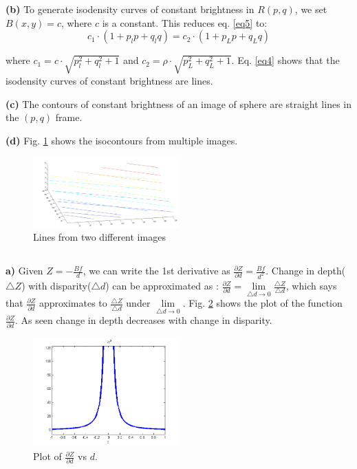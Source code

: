 \documentclass[11pt]{article}
\begin{document}
\textbf{(b)} To generate isodensity curves of constant brightness in $R(p,q)$, we set $B(x,y) = c$, where $c$ is a constant. This reduces eq. \ref{eq5} to:
\vspace{-10pt}
\begin{equation}
 c_1 \cdot (1+p_l p + q_lq) = c_2 \cdot (1+p_L p + q_L q) 
 \label{eq6}
\end{equation}

where $c_1 = c \cdot \sqrt{p_l^2 + q_l^2 + 1}$ and $c_2 = \rho \cdot \sqrt{p_L^2 + q_L^2 + 1}$. Eq. \ref{eq4} shows that the isodensity curves of constant brightness are lines. 

\textbf{(c)} The contours of constant brightness of an image of sphere are straight lines in the $(p,q)$ frame.

\textbf{(d)} Fig. \ref{fig4} shows the isocontours from multiple images. 

\begin{figure}[!hbt]
\centering
\includegraphics[width=0.5\textwidth]{q2d.png}
\caption{Lines from two different images}
\label{fig4}
\end{figure}
\vspace{-10pt}
\subsection{} 
\textbf{a)} Given $Z = -\frac{Bf}{d}$, we can write the 1st derivative as $\frac{\partial Z}{\partial d} = \frac{Bf}{d^2}$. Change in depth($\triangle Z$) with disparity($\triangle d$) can be approximated as : $\frac{\partial Z}{\partial d} = \lim\limits_{\triangle d \rightarrow 0}\frac{\triangle Z}{\triangle d} $, which says that  $\frac{\partial Z}{\partial d}$ approximates to $\frac{\triangle Z}{\triangle d}$ under $\lim\limits_{\triangle d \rightarrow 0}$. Fig. \ref{fig3} shows the plot of the function $\frac{\partial Z}{\partial d}$. As seen change in depth decreases with change in disparity. 
\vspace{-10pt}
\begin{figure}[[!hbt]
\centering
  \includegraphics[width=0.5\textwidth]{pic4.png}
  \caption{Plot of $\frac{\partial Z}{\partial d}$ vs $d$.}
  \label{fig3}
\end{figure}
\end{document}
